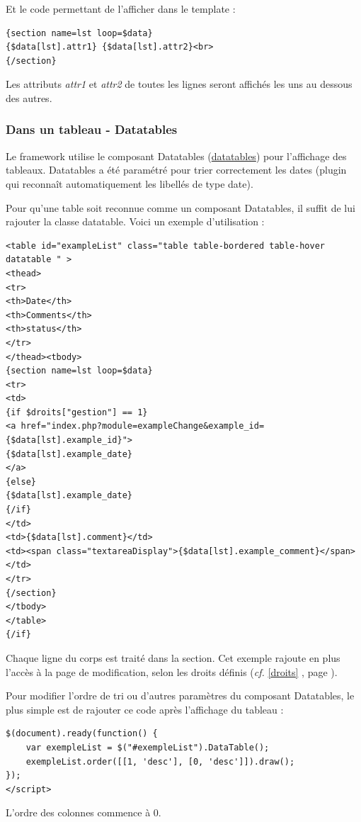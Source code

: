Et le code permettant de l'afficher dans le template :
\begin{lstlisting}
{section name=lst loop=$data}
{$data[lst].attr1} {$data[lst].attr2}<br>
{/section}
\end{lstlisting}

Les attributs \textit{attr1} et \textit{attr2} de toutes les lignes seront affichés les uns au dessous des autres.

\subsubsection{Dans un tableau - Datatables}

Le framework utilise le composant Datatables (\url{datatables}) pour l'affichage des tableaux. Datatables a été paramétré pour trier correctement les dates (plugin qui reconnaît automatiquement les libellés de type date).

Pour qu'une table soit reconnue comme un composant Datatables, il suffit de lui rajouter la classe datatable. Voici un exemple d'utilisation :
\begin{lstlisting}
<table id="exampleList" class="table table-bordered table-hover datatable " >
<thead>
<tr>
<th>Date</th>
<th>Comments</th>
<th>status</th>
</tr>
</thead><tbody>
{section name=lst loop=$data}
<tr>
<td>
{if $droits["gestion"] == 1}
<a href="index.php?module=exampleChange&example_id={$data[lst].example_id}">
{$data[lst].example_date}
</a>
{else}
{$data[lst].example_date}
{/if}
</td>
<td>{$data[lst].comment}</td>
<td><span class="textareaDisplay">{$data[lst].example_comment}</span></td>
</tr>
{/section}
</tbody>
</table>
{/if}
\end{lstlisting}

Chaque ligne du corps est traité dans la section. Cet exemple rajoute en plus l'accès à la page de modification, selon les droits définis (\textit{cf.} \ref{droits} \textit{}, page \pageref{droits}).

Pour modifier l'ordre de tri ou d'autres paramètres du composant Datatables, le plus simple est de rajouter ce code après l'affichage du tableau :

\begin{lstlisting}
$(document).ready(function() {
	var exempleList = $("#exempleList").DataTable();
	exempleList.order([[1, 'desc'], [0, 'desc']]).draw();
});
</script>
\end{lstlisting}

L'ordre des colonnes commence à 0.


